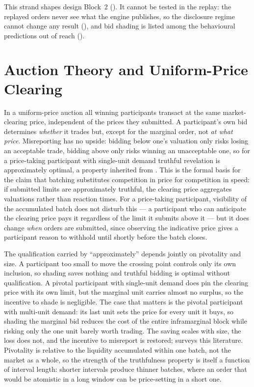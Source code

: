 This strand shapes design Block~2 (). It cannot be
tested in the replay: the replayed orders never see what the engine
publishes, so the disclosure regime cannot change any result
(), and bid shading is listed among the behavioural
predictions out of reach ().

\section{Auction Theory and Uniform-Price Clearing}
\label{sec:auctiontheory}

In a uniform-price auction all winning participants transact at the same
market-clearing price, independent of the prices they submitted. A
participant's own bid determines \emph{whether} it trades but, except for
the marginal order, not \emph{at what price}. Misreporting has no upside:
bidding below one's valuation only risks losing an acceptable trade,
bidding above only risks winning an unacceptable one, so for a
price-taking participant with single-unit demand truthful revelation is
approximately optimal, a property inherited from
\citet{vickrey1961counterspeculation}. This is the formal basis for the
claim that batching substitutes competition in price for competition in
speed: if submitted limits are approximately truthful, the clearing price
aggregates valuations rather than reaction times. For a price-taking
participant, visibility of the accumulated batch does not disturb this ---
a participant who can anticipate the clearing price pays it regardless of
the limit it submits above it --- but it does change \emph{when} orders
are submitted, since
observing the indicative price gives a participant reason to withhold
until shortly before the batch closes.

The qualification carried by ``approximately'' depends jointly on
pivotality and size. A participant too small to move the crossing point
controls only its own inclusion, so shading saves nothing and truthful
bidding is optimal without qualification. A pivotal participant with
single-unit demand does pin the clearing price with its own limit, but the
marginal unit carries almost no surplus, so the incentive to shade is
negligible. The case that matters is the pivotal participant with
multi-unit demand: its last unit sets the price for every unit it buys, so
shading the marginal bid reduces the cost of the entire inframarginal
block while risking only the one unit barely worth trading. The saving
scales with size, the loss does not, and the incentive to misreport is
restored; \citet{klemperer1999auction} surveys this literature. Pivotality
is relative to the liquidity accumulated within one batch, not the market
as a whole, so the strength of the truthfulness property is itself a
function of interval length: shorter intervals produce thinner batches,
where an order that would be atomistic in a long window can be
price-setting in a short one.

